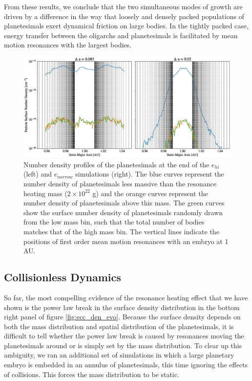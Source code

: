 From these results, we conclude that the two simultaneous modes of growth are driven by a difference in the way that loosely 
and densely packed populations of planetesimals exert dynamical friction on large bodies. In the tightly packed case, energy 
transfer between the oligarchs and planetesimals is facilitated by mean motion resonances with the largest bodies.

\begin{figure}
    \includegraphics[width=1.0\textwidth]{figures/plSS/surf_den_dyn_fric.eps}
    \caption{Number density profiles of the planetesimals at the end of the $e_{hi}$ (left) and $e_{narrow}$ simulations (right). 
    The blue curves represent the number density of planetesimals less massive than the resonance heating mass ($2 \times 
    10^{22}$ g) and the orange curves represent the number density of planetesimals above this mass. The green curves show 
    the surface number density of planetesimals randomly drawn from the low mass bin, such that the total number of bodies 
    matches that of the high mass bin. The vertical lines indicate the positions of first order mean motion resonances with an 
    embryo at 1 AU.}
    \label{fig:num_den}
\end{figure}

\subsection{Collisionless Dynamics}\label{sec:dynint}

So far, the most compelling evidence of the resonance heating effect that we have shown is the power law break in the surface 
density distribution in the bottom right panel of figure \ref{fig:ecc_den_evo}. Because the surface density depends on both the 
mass distribution and spatial distribution of the planetesimals, it is difficult to tell whether the power law break is caused by 
resonances moving the planetesimals around or is simply set by the mass distribution. To clear up this ambiguity, we ran an 
additional set of simulations in which a large planetary embryo is embedded in an annulus of planetesimals, this time ignoring 
the effects of collisions. This forces the mass distribution to be static.

